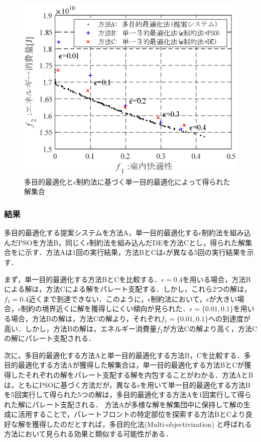 \begin{figure}[htbp]
  \begin{center}
    \includegraphics[width=0.7\linewidth]{fig/sim_result_pareto_multisingle.eps}
  \end{center}
  \caption{ 多目的最適化と$\epsilon$制約法に基づく単一目的最適化によって得られた解集合}
  \label{fig::sim_result_pareto_multisingle}
\end{figure}

\subsubsection{結果}
多目的最適化する提案システムを方法A，単一目的最適化する$\epsilon$制約法を組み込んだPSOを方法B，同じく$\epsilon$制約法を組み込んだDEを方法Cとし，得られた解集合をに示す．方法Aは1回の実行結果，方法BとCは$\epsilon$が異なる5回の実行結果を示す．

まず，単一目的最適化する方法BとCを比較する．$\epsilon=0.4$を用いる場合，方法Bによる解は，方法Cによる解をパレート支配する．しかし，これら2つの解は，$f_1=0.4$近くまで到達できない．このように，$\epsilon$制約法において，$\epsilon$が大きい場合，$\epsilon$制約の境界近くに解を獲得しにくい傾向が見られた．$\epsilon=\{0.01,0.1\}$を用いる場合，方法Bの解は，方法Cの解より，それぞれ$f_1=\{0.01,0.1\}$への到達度が高い．しかし，方法Bの解は，エネルギー消費量$f_2$が方法Cの解より高く，方法Cの解にパレート支配される．

次に，多目的最適化する方法Aと単一目的最適化する方法B，Cを比較する．多目的最適化する方法Aが獲得した解集合は，単一目的最適化する方法BとCが獲得したそれぞれの解をパレート支配する解を内包することがわかる．方法AとBは，ともにPSOに基づく方法だが，異なる$\epsilon$を用いて単一目的最適化する方法Bを5回実行して得られた5つの解は，多目的最適化する方法Aを1回実行して得られた解にパレート支配される．
方法Aが多様な解を解集団中に保持して解の生成に活用することで，パレートフロントの特定部位を探索する方法BとCより良好な解を獲得したのだとすれば，多目的化法(Multi-objectivization) \cite{Knowles10}と呼ばれる方法において見られる効果と類似する可能性がある．

